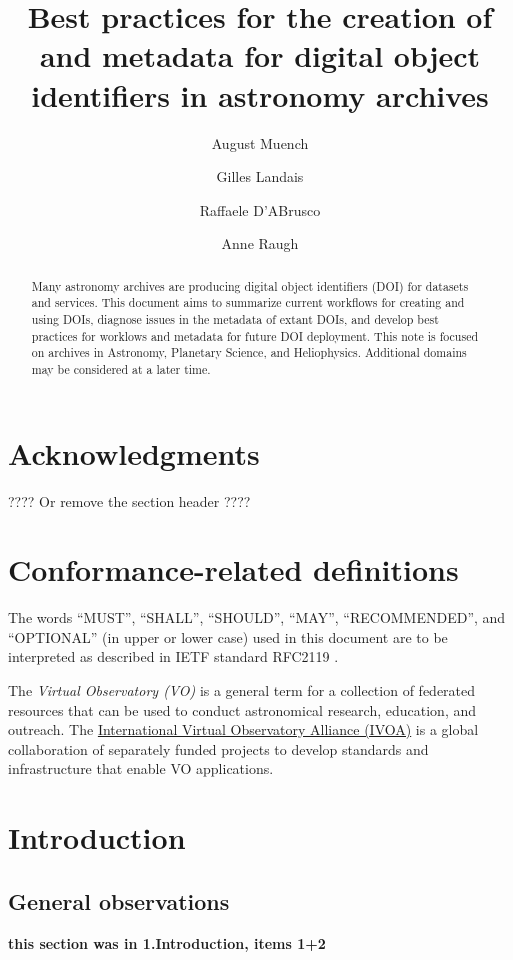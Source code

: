 \documentclass[11pt,a4paper]{ivoa}
\title{Best practices for the creation of and metadata for digital object identifiers in astronomy archives}
\author[https://orcid.org/0000-0003-0666-6367]{August Muench}
\author[]{Gilles Landais}
\author[]{Raffaele D'ABrusco}
\author[]{Anne Raugh}
\begin{document}

\begin{abstract}
Many astronomy archives are producing digital object identifiers (DOI) for datasets and services.
This document aims to summarize current workflows for creating and using DOIs, 
diagnose issues in the metadata of extant DOIs, 
and develop best practices for worklows and metadata for future DOI deployment.
This note is focused on archives in Astronomy, Planetary Science, and Heliophysics. 
Additional domains may be considered at a later time.
\end{abstract}


\section*{Acknowledgments}

???? Or remove the section header ????

\section*{Conformance-related definitions}

The words ``MUST'', ``SHALL'', ``SHOULD'', ``MAY'', ``RECOMMENDED'', and
``OPTIONAL'' (in upper or lower case) used in this document are to be
interpreted as described in IETF standard RFC2119 \citep{std:RFC2119}.

The \emph{Virtual Observatory (VO)} is a general term for a collection of federated resources that can be used to conduct astronomical research, education, and outreach.
The \href{https://www.ivoa.net}{International Virtual Observatory Alliance (IVOA)} is a global collaboration of separately funded projects to develop standards and infrastructure that enable VO applications.


\section{Introduction}
\label{sec:intro}

\subsection{General observations} 
\textbf{\color{red} this section was in 1.Introduction, items 1+2}
\end{document}
